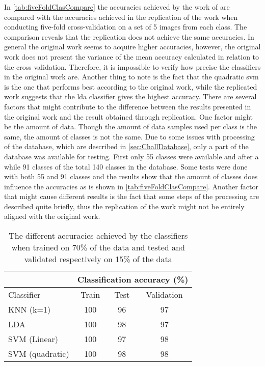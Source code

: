In \autoref{tab:fiveFoldClasCompare} the accuracies achieved by the work of \cite{Khan2017a} are compared with the accuracies achieved in the replication of the work when conducting five-fold cross-validation on a set of 5 images from each class. The comparison reveals that the replication does not achieve the same accuracies. In general the original work seems to acquire higher accuracies, however, the original work does not present the variance of the mean accuracy calculated in relation to the cross validation. Therefore, it is impossible to verify how precise the classifiers in the original work are. Another thing to note is the fact that the quadratic \gls{svm} is the one that performs best according to the original work, while the replicated work suggests that the \gls{lda} classifier gives the highest accuracy. There are several factors that might contribute to the difference between the results presented in the original work and the result obtained through replication. One factor might be the amount of data. Though the amount of data samples used per class is the same, the amount of classes is not the same. Due to some issues with processing of the database, which are described in \autoref{sec:ChallDatabase}, only a part of the database was available for testing. First only 55 classes were available and after a while 91 classes of the total 140 classes in the database. Some tests were done with both 55 and 91 classes and the results show that the amount of classes does influence the accuracies as is shown in \autoref{tab:fiveFoldClasCompare}. Another factor that might cause different results is the fact that some steps of the processing are described quite briefly, thus the replication of the work might not be entirely aligned with the original work. 

\begin{table}[H]
\centering
\begin{tabular}{|l|c|c|c|}
\cline{2-4}
\multicolumn{1}{c|}{}&\multicolumn{3}{c|}{Classification accuracy (\%)}\\
\hline
Classifier&Train&Test&Validation\\
\hline
KNN (k=1)&100&96&97\\
\hline
LDA&100&98&97\\
\hline
SVM (Linear)&100&97&98\\
\hline
SVM (quadratic)&100&98&98\\
\hline
\end{tabular}
\caption{The different accuracies achieved by the classifiers when trained on 70\% of the data and tested and validated respectively on 15\% of the data}
\label{tab:ClasAccMachine}
\end{table} 

